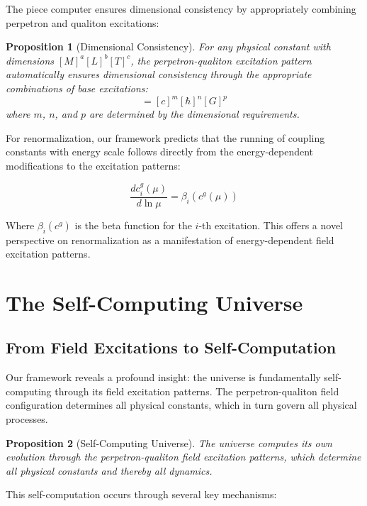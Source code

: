 \documentclass{article}
\newtheorem{proposition}{Proposition}
\begin{document}
The piece computer ensures dimensional consistency by appropriately combining perpetron and qualiton excitations:

\begin{proposition}[Dimensional Consistency]
For any physical constant with dimensions $[M]^a [L]^b [T]^c$, the perpetron-qualiton excitation pattern automatically ensures dimensional consistency through the appropriate combinations of base excitations:
\begin{equation}
[g] = [c]^m [\hbar]^n [G]^p
\end{equation}
where $m$, $n$, and $p$ are determined by the dimensional requirements.
\end{proposition}

For renormalization, our framework predicts that the running of coupling constants with energy scale follows directly from the energy-dependent modifications to the excitation patterns:

\begin{equation}
\frac{d c_i^g(\mu)}{d \ln \mu} = \beta_i(c^g(\mu))
\end{equation}

Where $\beta_i(c^g)$ is the beta function for the $i$-th excitation. This offers a novel perspective on renormalization as a manifestation of energy-dependent field excitation patterns.

\section{The Self-Computing Universe}

\subsection{From Field Excitations to Self-Computation}

Our framework reveals a profound insight: the universe is fundamentally self-computing through its field excitation patterns. The perpetron-qualiton field configuration determines all physical constants, which in turn govern all physical processes.

\begin{proposition}[Self-Computing Universe]
The universe computes its own evolution through the perpetron-qualiton field excitation patterns, which determine all physical constants and thereby all dynamics.
\end{proposition}

This self-computation occurs through several key mechanisms:
\end{document}
